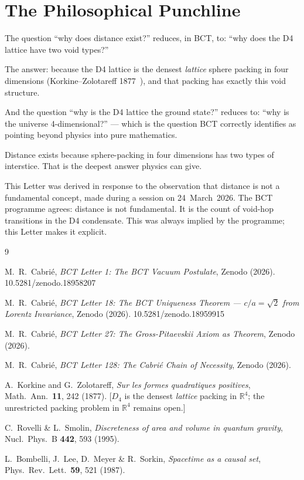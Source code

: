 \documentclass[aps,prl,twocolumn,showpacs,preprintnumbers]{revtex4-2}
\begin{document}
\section{The Philosophical Punchline}

The question ``why does distance exist?'' reduces, in BCT, to:
``why does the D4 lattice have two void types?''

The answer: because the D4 lattice is the densest \emph{lattice}
sphere packing in four dimensions (Korkine--Zolotareff
1877~\cite{korkine}), and that packing has exactly this void
structure.

And the question ``why is the D4 lattice the ground state?''
reduces to: ``why is the universe 4-dimensional?'' --- which is
the question BCT correctly identifies as pointing beyond physics
into pure mathematics.

Distance exists because sphere-packing in four dimensions has
two types of interstice. That is the deepest answer physics
can give.

\begin{acknowledgments}
This Letter was derived in response to the observation that
distance is not a fundamental concept, made during a session
on 24~March~2026. The BCT programme agrees: distance is not
fundamental. It is the count of void-hop transitions in the
D4 condensate. This was always implied by the programme;
this Letter makes it explicit.
\end{acknowledgments}

\begin{thebibliography}{9}

M.~R.~Cabri\'e, \textit{BCT Letter 1: The BCT Vacuum Postulate},
Zenodo (2026). 10.5281/zenodo.18958207

M.~R.~Cabri\'e, \textit{BCT Letter 18: The BCT Uniqueness Theorem
--- $c/a=\sqrt{2}$ from Lorentz Invariance},
Zenodo (2026). 10.5281/zenodo.18959915

M.~R.~Cabri\'e, \textit{BCT Letter 27: The Gross-Pitaevskii
Axiom as Theorem}, Zenodo (2026).

M.~R.~Cabri\'e, \textit{BCT Letter 128: The Cabri\'e Chain of
Necessity}, Zenodo (2026).

A.~Korkine and G.~Zolotareff,
\textit{Sur les formes quadratiques positives},
Math.\ Ann.\ \textbf{11}, 242 (1877).
[$D_4$ is the densest \emph{lattice} packing in $\mathbb{R}^4$;
the unrestricted packing problem in $\mathbb{R}^4$ remains open.]


C.~Rovelli \& L.~Smolin,
\textit{Discreteness of area and volume in quantum gravity},
Nucl.\ Phys.\ B \textbf{442}, 593 (1995).

L.~Bombelli, J.~Lee, D.~Meyer \& R.~Sorkin,
\textit{Spacetime as a causal set},
Phys.\ Rev.\ Lett.\ \textbf{59}, 521 (1987).

\end{thebibliography}
\end{document}

